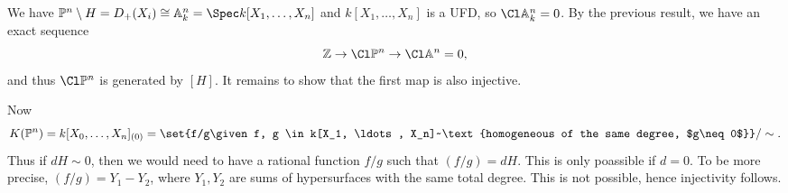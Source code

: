 We have $\mathbb{P}^n\setminus H = D_+(X_i) \cong \mathbb{A}^n_k = \Spec k[X_1, \ldots, X_n]$
and $k[X_1, \ldots, X_n]$ is a UFD, so $\Cl \mathbb{A}^n_k = 0$. By the previous result,
we have an exact sequence
\[ \mathbb{Z} \to \Cl \mathbb{P}^n \to \Cl \mathbb{A}^n = 0, \]
and thus $\Cl \mathbb{P}^n$ is generated by $[H]$. It remains to show that the first
map is also injective.

Now
\[ K(\mathbb{P}^n) = k[X_0, \ldots, X_n]_{(0)} = \set{f/g\given f, g \in k[X_1, \ldots, X_n]~\text{homogeneous of the same degree, $g\neq 0$}}/\sim. \]
Thus if $dH \sim 0$, then we would need to have a rational function $f/g$ such that
$(f/g) = dH$. This is only poassible if $d = 0$. To be more precise, $(f/g) = Y_1 - Y_2$,
where $Y_1, Y_2$ are sums of hypersurfaces with the same total degree. This is not
possible, hence injectivity follows.

